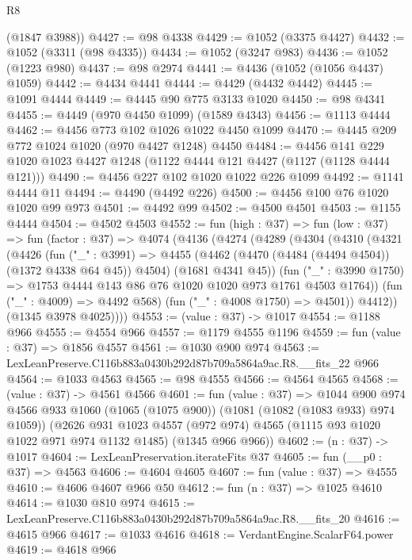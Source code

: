 \begin{lexlean}{R8}
\begin{coremodule}
      (@1847 @3988))
@4427 := @98 @4338
@4429 := @1052 (@3375 @4427)
@4432 := @1052 (@3311 (@98 @4335))
@4434 := @1052 (@3247 @983)
@4436 := @1052 (@1223 @980)
@4437 := @98 @2974
@4441 := @4436 (@1052 (@1056 @4437) @1059)
@4442 := @4434 @4441
@4444 := @4429 (@4432 @4442)
@4445 := @1091 @4444
@4449 := @4445 @90 @775 @3133 @1020
@4450 := @98 @4341
@4455 := @4449 (@970 @4450 @1099) (@1589 @4343)
@4456 := @1113 @4444
@4462 := @4456 @773 @102 @1026 @1022 @4450 @1099
@4470 := @4445 @209 @772 @1024 @1020 (@970 @4427 @1248) @4450
@4484 := @4456 @141 @229 @1020 @1023 @4427 @1248 (@1122 @4444 @121 @4427 (@1127 (@1128 @4444 @121)))
@4490 := @4456 @227 @102 @1020 @1022 @226 @1099
@4492 := @1141 @4444 @11
@4494 := @4490 (@4492 @226)
@4500 := @4456 @100 @76 @1020 @1020 @99 @973
@4501 := @4492 @99
@4502 := @4500 @4501
@4503 := @1155 @4444
@4504 := @4502 @4503
@4552 := fun (high : @37) =>
  fun (low : @37) =>
  fun (factor : @37) =>
  @4074
    (@4136
      (@4274
        (@4289
          (@4304
            (@4310
              (@4321
                (@4426
                  (fun ("_" : @3991) =>
                  @4455
                    (@4462 (@4470 (@4484 (@4494 @4504)) (@1372 @4338 @64 @45)) @4504)
                    (@1681 @4341 @45))
                  (fun ("_" : @3990 @1750) =>
                  @1753 @4444 @143 @86 @76 @1020 @1020 @973 @1761 @4503 @1764))
                (fun ("_" : @4009) => @4492 @568)
                (fun ("_" : @4008 @1750) => @4501))
              @4412))
          (@1345 @3978 @4025))))
@4553 := (value : @37) -> @1017
@4554 := @1188 @966
@4555 := @4554 @966
@4557 := @1179 @4555 @1196
@4559 := fun (value : @37) => @1856 @4557
@4561 := @1030 @900 @974
@4563 := LexLeanPreserve.C116b883a0430b292d87b709a5864a9ac.R8.__fits_22 @966
@4564 := @1033 @4563
@4565 := @98 @4555
@4566 := @4564 @4565
@4568 := (value : @37) -> @4561 @4566
@4601 := fun (value : @37) =>
  @1044
    @900
    @974
    @4566
    @933
    @1060
    (@1065 (@1075 @900))
    (@1081 (@1082 (@1083 @933) @974 @1059))
    (@2626
      @931
      @1023
      @4557
      (@972 @974)
      @4565
      (@1115 @93 @1020 @1022 @971 @974 @1132 @1485)
      (@1345 @966 @966))
@4602 := (n : @37) -> @1017
@4604 := LexLeanPreservation.iterateFits @37
@4605 := fun (__p0 : @37) => @4563
@4606 := @4604 @4605
@4607 := fun (value : @37) => @4555
@4610 := @4606 @4607 @966 @50
@4612 := fun (n : @37) => @1025 @4610
@4614 := @1030 @810 @974
@4615 := LexLeanPreserve.C116b883a0430b292d87b709a5864a9ac.R8.__fits_20
@4616 := @4615 @966
@4617 := @1033 @4616
@4618 := VerdantEngine.ScalarF64.power
@4619 := @4618 @966

\end{coremodule}
\end{lexlean}
